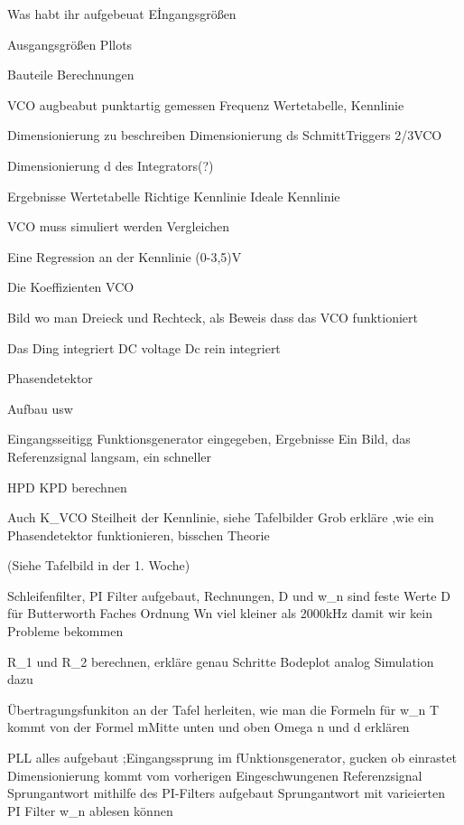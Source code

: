 Was habt ihr aufgebeuat
Eİngangsgrößen

Ausgangsgrößen
Pllots

Bauteile Berechnungen


VCO augbeabut punktartig gemessen
Frequenz Wertetabelle, Kennlinie

Dimensionierung zu beschreiben
Dimensionierung ds SchmittTriggers
2/3VCO

Dimensionierung d des Integrators(?)

Ergebnisse
Wertetabelle
Richtige Kennlinie
Ideale Kennlinie

VCO muss simuliert werden
Vergleichen

Eine Regression an der Kennlinie (0-3,5)V

Die Koeffizienten VCO

Bild wo man Dreieck und Rechteck, als Beweis dass das VCO funktioniert


Das Ding integriert DC voltage
Dc rein integriert

Phasendetektor

Aufbau usw

Eingangsseitigg Funktionsgenerator eingegeben, Ergebnisse
Ein Bild, das Referenzsignal langsam, ein schneller

HPD KPD berechnen

Auch K_VCO Steilheit der Kennlinie, siehe Tafelbilder
Grob erkläre ,wie ein Phasendetektor funktionieren, bisschen Theorie

(Siehe Tafelbild in der 1. Woche)

Schleifenfilter, PI Filter aufgebaut, Rechnungen, 
D und w_n sind feste Werte
D für Butterworth Faches  Ordnung
Wn viel kleiner als 2000kHz damit wir kein Probleme bekommen

R_1 und R_2 berechnen, erkläre genau Schritte
Bodeplot analog 
Simulation dazu

Übertragungsfunkiton an der Tafel herleiten, wie man die Formeln für w_n T kommt von der Formel mMitte unten und oben 
Omega n und d erklären

PLL alles aufgebaut
;Eingangssprung im fUnktionsgenerator, gucken ob einrastet
Dimensionierung kommt vom vorherigen 
Eingeschwungenen Referenzsignal
Sprungantwort mithilfe des PI-Filters aufgebaut
Sprungantwort mit varieierten PI Filter
w_n ablesen können
